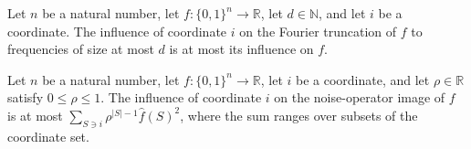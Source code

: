 \begin{lemma}
\label{KKL.influence_lowDegreePart_le}
\leanok
{}
Let $n$ be a natural number, let $f:\{0,1\}^n\to\mathbb R$, let $d\in\mathbb N$, and let
$i$ be a coordinate. The influence of coordinate $i$ on the Fourier truncation of $f$ to
frequencies of size at most $d$ is at most its influence on $f$.
\end{lemma}

\begin{lemma}
\label{KKL.influence_noiseOp_le_noisyInfluence}
\leanok
{}
Let $n$ be a natural number, let $f:\{0,1\}^n\to\mathbb R$, let $i$ be a coordinate, and
let $\rho\in\mathbb R$ satisfy $0\leq\rho\leq1$. The influence of coordinate $i$ on the
noise-operator image of $f$ is at most $\sum_{S\ni i}\rho^{|S|-1}\widehat f(S)^2$, where
the sum ranges over subsets of the coordinate set.
\end{lemma}

